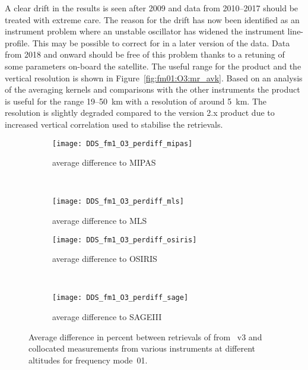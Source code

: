 A clear drift in the results is seen after 2009 and data from 2010--2017 should
be treated with extreme care. The reason for the  drift has now been identified
as an instrument problem where an unstable oscillator has widened the
instrument line-profile.  This may be possible to correct for in a later
version of the data.  Data from 2018 and onward should be free of this problem
thanks to a retuning  of some parameters on-board the satellite.  The useful
range for the product and the vertical resolution is shown in
Figure~\ref{fig:fm01:O3:mr_avk}.  Based on an analysis of the averaging kernels and
comparisons with the other instruments the product is useful for the range 19--50~km
with a resolution of around 5~km. The resolution is slightly degraded compared
to the version 2.x product due to increased vertical correlation used to
stabilise the retrievals.


\begin{figure}[tbhp]
    \centering
    \begin{subfigure}[b]{0.49\textwidth}
        \texttt{[image: DDS\_fm1\_O3\_perdiff\_mipas]}
        \caption{average difference to MIPAS}
        \label{fig:fm01:O3:profiles:MIPAS}
    \end{subfigure}
    \,
    \begin{subfigure}[b]{0.49\textwidth}
        \texttt{[image: DDS\_fm1\_O3\_perdiff\_mls]}
        \caption{average difference to MLS}
        \label{fig:fm01:O3:profiles:MLS}
    \end{subfigure}

    \begin{subfigure}[b]{0.49\textwidth}
        \texttt{[image: DDS\_fm1\_O3\_perdiff\_osiris]}
        \caption{average difference to OSIRIS}
        \label{fig:fm01:O3:profiles:OSIRIS}
    \end{subfigure}
    \,
    \begin{subfigure}[b]{0.49\textwidth}
        \texttt{[image: DDS\_fm1\_O3\_perdiff\_sage]}
        \caption{average difference to SAGEIII}
        \label{fig:fm01:O3:profiles:SAGEIII}
    \end{subfigure}
    \caption{Average difference in percent between retrievals of 
    from \smr~v3 and collocated measurements from various instruments at
    different altitudes for frequency mode~01.}
    \label{fig:fm01:O3:profiles}
\end{figure}

